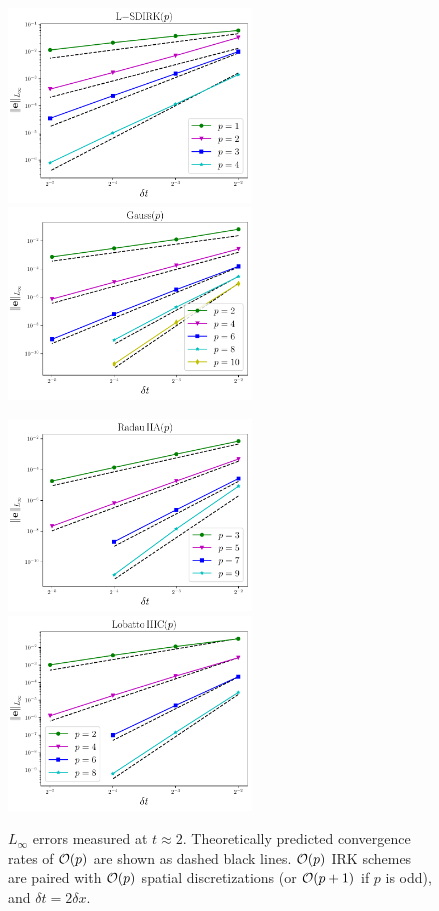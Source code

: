 \documentclass[review]{siamart}
\begin{document}
\begin{figure}[H]
\centerline{
\includegraphics[width = 0.575\textwidth]{figures/LSDIRK_d2_ex1}
\quad
\includegraphics[width = 0.575\textwidth]{figures/Gauss_d2_ex1}
}
\centerline{
\includegraphics[width = 0.575\textwidth]{figures/RadauIIA_d2_ex1}
\quad
\includegraphics[width = 0.575\textwidth]{figures/LobattoIIIC_d2_ex1}
}
\caption{$L_{\infty}$ errors measured at $t \approx 2$. Theoretically predicted convergence rates of ${\cal O}(p)$ are shown as dashed black lines. ${\cal O}(p)$ IRK schemes are paired with ${\cal O}(p)$ spatial discretizations (or ${\cal O}(p+1)$ if $p$ is odd), and $\delta t = 2 \delta x$. 
\label{fig:errors2D}
}
\end{figure}
\end{document}
